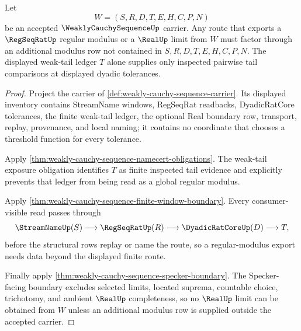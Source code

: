 \begin{theorem}
\label{thm:weakly-cauchy-sequence-regular-modulus-refusal}
Let
$$
W=(S,R,D,T,E,H,C,P,N)
$$
be an accepted $\WeaklyCauchySequenceUp$ carrier. Any route that exports a $\RegSeqRatUp$ regular modulus or a $\RealUp$ limit from $W$ must factor through an additional modulus row not contained in $S,R,D,T,E,H,C,P,N$. The displayed weak-tail ledger $T$ alone supplies only inspected pairwise tail comparisons at displayed dyadic tolerances.
\end{theorem}
\begin{proof}
Project the carrier of \autoref{def:weakly-cauchy-sequence-carrier}. Its displayed inventory contains StreamName windows, RegSeqRat readbacks, DyadicRatCore tolerances, the finite weak-tail ledger, the optional Real boundary row, transport, replay, provenance, and local naming; it contains no coordinate that chooses a threshold function for every tolerance.

Apply \autoref{thm:weakly-cauchy-sequence-namecert-obligations}. The weak-tail exposure obligation identifies $T$ as finite inspected tail evidence and explicitly prevents that ledger from being read as a global regular modulus.

Apply \autoref{thm:weakly-cauchy-sequence-finite-window-boundary}. Every consumer-visible read passes through
$$
\StreamNameUp(S)\longrightarrow \RegSeqRatUp(R)\longrightarrow \DyadicRatCoreUp(D)\longrightarrow T ,
$$
before the structural rows replay or name the route, so a regular-modulus export needs data beyond the displayed finite route.

Finally apply \autoref{thm:weakly-cauchy-sequence-specker-boundary}. The Specker-facing boundary excludes selected limits, located suprema, countable choice, trichotomy, and ambient $\RealUp$ completeness, so no $\RealUp$ limit can be obtained from $W$ unless an additional modulus row is supplied outside the accepted carrier.
\end{proof}

